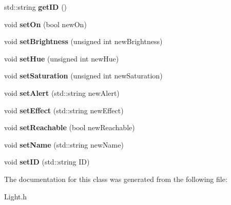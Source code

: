 \begin{DoxyCompactItemize}
std\+::string {\bfseries get\+ID} ()
\item 
\mbox{\label{classLight_abebbcc06640fed324f219f97bbe9ebc8}} 
void {\bfseries set\+On} (bool new\+On)
\item 
\mbox{\label{classLight_a701654cef144584141ccf50a3f578deb}} 
void {\bfseries set\+Brightness} (unsigned int new\+Brightness)
\item 
\mbox{\label{classLight_a94ab29b590c4030d3049f48107984abb}} 
void {\bfseries set\+Hue} (unsigned int new\+Hue)
\item 
\mbox{\label{classLight_a82b579ab198200d5f06982f945abcf93}} 
void {\bfseries set\+Saturation} (unsigned int new\+Saturation)
\item 
\mbox{\label{classLight_a6e6270f5cd4c8871e3bc71530bd8aee1}} 
void {\bfseries set\+Alert} (std\+::string new\+Alert)
\item 
\mbox{\label{classLight_a85b94f712992963240cec81c40f57738}} 
void {\bfseries set\+Effect} (std\+::string new\+Effect)
\item 
\mbox{\label{classLight_af55ecf91c4bc1df4d36005395ee022bf}} 
void {\bfseries set\+Reachable} (bool new\+Reachable)
\item 
\mbox{\label{classLight_acbb28a74fceea5fc98568b315e328eac}} 
void {\bfseries set\+Name} (std\+::string new\+Name)
\item 
\mbox{\label{classLight_a65b09111ec3551051f3d321eb3e026d9}} 
void {\bfseries set\+ID} (std\+::string ID)
\end{DoxyCompactItemize}


The documentation for this class was generated from the following file\+:\begin{DoxyCompactItemize}
\item 
Light.\+h\end{DoxyCompactItemize}
